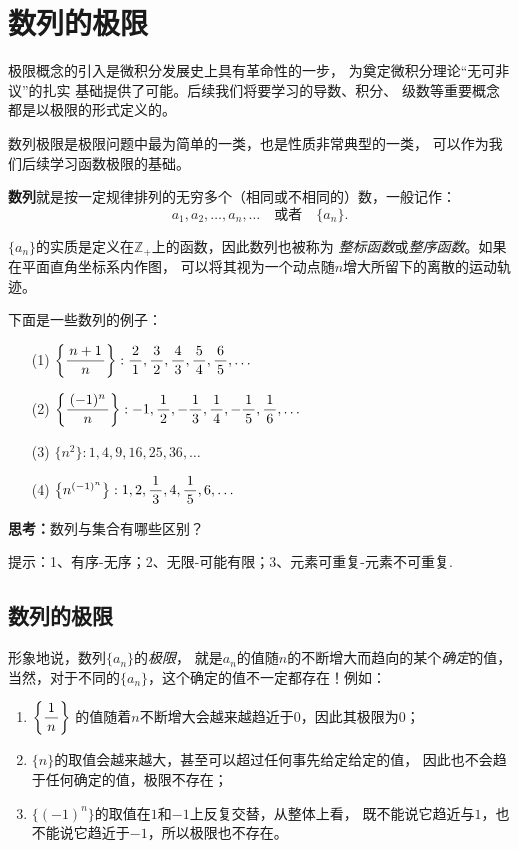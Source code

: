 \newpage
\section{数列的极限}

极限概念的引入是微积分发展史上具有革命性的一步，
为奠定微积分理论“无可非议”的扎实
基础提供了可能。后续我们将要学习的导数、积分、
级数等重要概念都是以极限的形式定义的。

数列极限是极限问题中最为简单的一类，也是性质非常典型的一类，
可以作为我们后续学习函数极限的基础。

\bs
{\bf 数列}就是按一定规律排列的无穷多个（相同或不相同的）数，一般记作：
$$a_1,a_2,\ldots,a_n,\ldots\quad\mbox{或者}\quad\{a_n\}.$$

$\{a_n\}$的实质是定义在$\mathbb{Z}_+$上的函数，因此数列也被称为
{\it 整标函数}或{\it 整序函数}。如果在平面直角坐标系内作图，
可以将其视为一个动点随$n$增大所留下的离散的运动轨迹。

下面是一些数列的例子：
\begin{enumerate}[(1)]
  \setlength{\itemindent}{1cm}
  \item[(1)] $\left\{\displaystyle\frac{\,{n+1}\,}{\,{n}\,}\right\}:\displaystyle\frac{\,{2}\,}{\,{1}\,},\displaystyle\frac{\,{3}\,}{\,{2}\,},\displaystyle\frac{\,{4}\,}{\,{3}\,},\displaystyle\frac{\,{5}\,}{\,{4}\,},\displaystyle\frac{\,{6}\,}{\,{5}\,},\ldots$
  \item[(2)] $\left\{\displaystyle\frac{\,{(-1)^n}\,}{\,{n}\,}\right\}:-1,\displaystyle\frac{\,{1}\,}{\,{2}\,},-\displaystyle\frac{\,{1}\,}{\,{3}\,},\displaystyle\frac{\,{1}\,}{\,{4}\,},-\displaystyle\frac{\,{1}\,}{\,{5}\,},\displaystyle\frac{\,{1}\,}{\,{6}\,},\ldots$
  \item[(3)] $\{n^2\}:1,4,9,16,25,36,\ldots$
  \item[(4)] $\left\{n^{(-1)^n}\right\}:1,2,\displaystyle\frac{\,{1}\,}{\,{3}\,},4,\displaystyle\frac{\,{1}\,}{\,{5}\,},6,\ldots$
\end{enumerate}

\bs
{\bf 思考：}数列与集合有哪些区别？

\ifhint
提示：1、有序-无序；2、无限-可能有限；3、元素可重复-元素不可重复.
\fi

\subsection{数列的极限}

形象地说，数列$\{a_n\}$的{\it 极限}，
就是$a_n$的值随$n$的不断增大而趋向的某个{\it 确定}的值，
当然，对于不同的$\{a_n\}$，这个确定的值不一定都存在！例如：
\begin{enumerate}[(1)]
  \setlength{\itemindent}{1cm}
  \item $\left\{\displaystyle\frac{\,{1}\,}{\,{n}\,}\right\}$
  的值随着$n$不断增大会越来越趋近于$0$，因此其极限为$0$；
  \item $\{n\}$的取值会越来越大，甚至可以超过任何事先给定给定的值，
  因此也不会趋于任何确定的值，极限不存在；
  \item $\{(-1)^n\}$的取值在$1$和$-1$上反复交替，从整体上看，
  既不能说它趋近与$1$，也不能说它趋近于$-1$，所以极限也不存在。
\end{enumerate}

